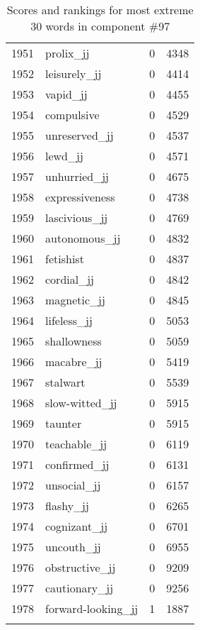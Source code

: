 \begin{longtable}[!htbp]{| rlr@{.}l |}
    1951 & prolix\_jj & 0 & 4348 \\
    1952 & leisurely\_jj & 0 & 4414 \\
    1953 & vapid\_jj & 0 & 4455 \\
    1954 & compulsive & 0 & 4529 \\
    1955 & unreserved\_jj & 0 & 4537 \\
    1956 & lewd\_jj & 0 & 4571 \\
    1957 & unhurried\_jj & 0 & 4675 \\
    1958 & expressiveness & 0 & 4738 \\
    1959 & lascivious\_jj & 0 & 4769 \\
    1960 & autonomous\_jj & 0 & 4832 \\
    1961 & fetishist & 0 & 4837 \\
    1962 & cordial\_jj & 0 & 4842 \\
    1963 & magnetic\_jj & 0 & 4845 \\
    1964 & lifeless\_jj & 0 & 5053 \\
    1965 & shallowness & 0 & 5059 \\
    1966 & macabre\_jj & 0 & 5419 \\
    1967 & stalwart & 0 & 5539 \\
    1968 & slow-witted\_jj & 0 & 5915 \\
    1969 & taunter & 0 & 5915 \\
    1970 & teachable\_jj & 0 & 6119 \\
    1971 & confirmed\_jj & 0 & 6131 \\
    1972 & unsocial\_jj & 0 & 6157 \\
    1973 & flashy\_jj & 0 & 6265 \\
    1974 & cognizant\_jj & 0 & 6701 \\
    1975 & uncouth\_jj & 0 & 6955 \\
    1976 & obstructive\_jj & 0 & 9209 \\
    1977 & cautionary\_jj & 0 & 9256 \\
    1978 & forward-looking\_jj & 1 & 1887 \\
    \hline
    \caption{Scores and rankings for most extreme 30 words in component \#97} \\
\end{longtable}
